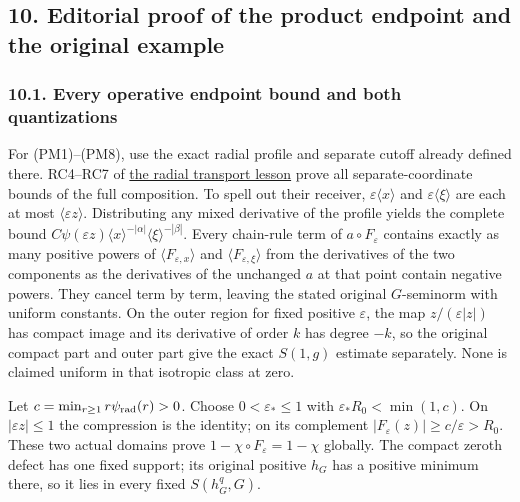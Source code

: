 \documentclass[
  11pt,
]{article}
\begin{document}
\subsection{10. Editorial proof of the product endpoint and the original
example}\label{editorial-proof-of-the-product-endpoint-and-the-original-example}

\subsubsection{10.1. Every operative endpoint bound and both
quantizations}\label{every-operative-endpoint-bound-and-both-quantizations}

For (PM1)--(PM8), use the exact radial profile and separate cutoff
already defined there. RC4--RC7 of
\href{radial-symbol-index-transport.pdf}{the radial transport lesson}
prove all separate-coordinate bounds of the full composition. To spell
out their receiver, \(\varepsilon\langle x\rangle\) and
\(\varepsilon\langle\xi\rangle\) are each at most
\(\langle\varepsilon z\rangle\). Distributing any mixed derivative of
the profile yields the complete bound
\(C\psi(\varepsilon z)\langle x\rangle^{-|\alpha|}\langle\xi\rangle^{-|\beta|}\).
Every chain-rule term of \(a\circ F_\varepsilon\) contains exactly as
many positive powers of \(\langle F_{\varepsilon,x}\rangle\) and
\(\langle F_{\varepsilon,\xi}\rangle\) from the derivatives of the two
components as the derivatives of the unchanged \(a\) at that point
contain negative powers. They cancel term by term, leaving the stated
original \(G\)-seminorm with uniform constants. On the outer region for
fixed positive \(\varepsilon\), the map \(z/(\varepsilon|z|)\) has
compact image and its derivative of order \(k\) has degree \(-k\), so
the original compact part and outer part give the exact \(S(1,g)\)
estimate separately. None is claimed uniform in that isotropic class at
zero.

Let \(c=\min_{r\ge1}r\psi_{\rm rad}(r)>0\). Choose
\(0<\varepsilon_*\le1\) with \(\varepsilon_*R_0<\min(1,c)\). On
\(|\varepsilon z|\le1\) the compression is the identity; on its
complement \(|F_\varepsilon(z)|\ge c/\varepsilon>R_0\). These two actual
domains prove \(1-\chi\circ F_\varepsilon=1-\chi\) globally. The compact
zeroth defect has one fixed support; its original positive \(h_G\) has a
positive minimum there, so it lies in every fixed \(S(h_G^q,G)\).
\end{document}
